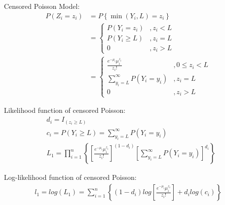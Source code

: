 \documentclass[11pt]{article}
\numberwithin{equation}{section}
\begin{document}
Censored Poisson Model:
\begin{align}
    P(Z_i=z_i) &= P \left\{ \min(Y_i,L)=z_i \right\} \nonumber\\
                &=\left\{
                    \begin{array}{ccc}
                        P(Y_i = z_i)&, z_i<L \nonumber\\
                        P(Y_i \ge L)&,z_i = L \nonumber\\
                        0&,z_i > L
                    \end{array}
                 \right.\\
             &=\left\{  \begin{array}{ccc}
                        \frac{e^{-\mu_i}\mu_i^{z_i}}{z_i!}&,0\le z_i<L \\
                        \sum_{y_i=L}^{\infty}{P(Y_i=y_i)}&,z_i = L \\
                        0&,z_i > L
                        \end{array}    \right.
\end{align}

                       

Likelihood function of censored Poisson:
\begin{align}
            &d_i = I_{(z_i\ge L)} \nonumber\\
            &c_i = P(Y_i\ge L)= \sum_{y_i=L}^{\infty}{P(Y_i=y_i)} \nonumber\\
            &L_1=\prod_{i=1}^n\left\{ \left[ \frac{e^{-\mu_i}\mu_i^{z_i}}{z_i!} \right]^{(1-d_i)} \left[  \sum_{y_i=L}^{\infty}{P(Y_i=y_i)}\right]^{d_i} \right\} 
\end{align}

Log-likelihood function of censored Poisson:
\begin{align}
            l_1=log(L_1)=
                \sum_{i=1}^n\left\{(1-d_i)log\left[ \frac{e^{-\mu_i}\mu_i^{z_i}}{z_i!} \right]
                + d_i log (c_i) \right\}  
\end{align}
\end{document}
